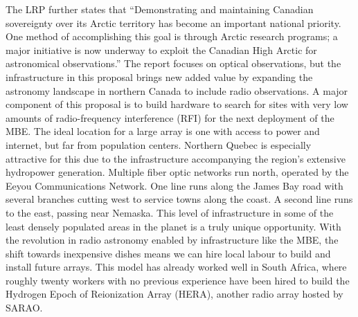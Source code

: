 \documentclass[letterpaper,11pt,preprint]{aastex}
\newcommand{\mbe}{{\rm MBE}}
\begin{document}
The LRP further states that ``Demonstrating and maintaining Canadian
sovereignty over its Arctic territory has become an important national
priority. One method of accomplishing this goal is through Arctic
research programs; a major initiative is now underway to exploit the
Canadian High Arctic for astronomical observations.''  The report
focuses on optical observations, but the infrastructure in this
proposal brings new added value by expanding the astronomy landscape
in northern Canada to include radio observations.  A major component
of this proposal is to build hardware to search for sites with very
low amounts of radio-frequency interference (RFI) for the next
deployment of the \mbe.  The ideal location for a large array is one
with access to power and internet, but far from population centers.
Northern Quebec is especially attractive for this due to the
infrastructure accompanying the region's extensive hydropower
generation.  Multiple fiber optic networks run north, operated by the
Eeyou Communications Network.  One line runs along the James Bay road
with several branches cutting west to service towns along the coast.
A second line runs to the east, passing near Nemaska.  This level of
infrastructure in some of the least densely populated areas in the
planet is a truly unique opportunity.  With the revolution in radio
astronomy enabled by infrastructure like the \mbe, the shift towards
inexpensive dishes means we can hire local labour to build and install
future arrays.  This model has already worked well in South Africa,
where roughly twenty workers with no previous experience have been
hired to build the Hydrogen Epoch of Reionization Array (HERA),
another radio array hosted by SARAO.
\end{document}

